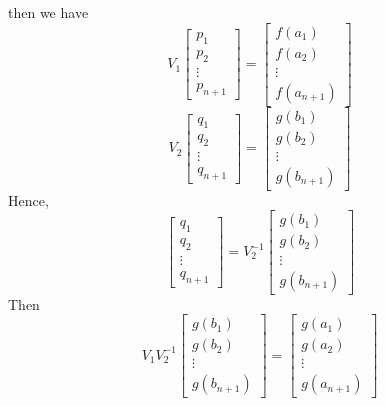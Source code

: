 \documentclass[11pt]{article}
\begin{document}
\begin{enumerate}
			 then we have
			 \[V_1\begin{bmatrix}
			 	p_1\\
			 	p_2\\
			 	\vdots\\
			 	p_{n + 1}
			 \end{bmatrix} = \begin{bmatrix}
			 	f(a_1)\\
			 	f(a_2)\\
			 	\vdots\\
			 	f(a_{n + 1})
			 \end{bmatrix} \]
			 \[V_2\begin{bmatrix}
			 	q_1\\
			 	q_2\\
			 	\vdots\\
			 	q_{n + 1}
			 \end{bmatrix} = \begin{bmatrix}
			 	g(b_1)\\
			 	g(b_2)\\
			 	\vdots\\
			 	g(b_{n + 1})
			 \end{bmatrix} \]
			Hence, 
			\[\begin{bmatrix}
			 	q_1\\
			 	q_2\\
			 	\vdots\\
			 	q_{n + 1}
			 \end{bmatrix} = V_2^{-1}\begin{bmatrix}
			 	g(b_1)\\
			 	g(b_2)\\
			 	\vdots\\
			 	g(b_{n + 1})
			 \end{bmatrix}\]
			 Then
			 \[
			 	V_1V_2^{-1}\begin{bmatrix}
			 	g(b_1)\\
			 	g(b_2)\\
			 	\vdots\\
			 	g(b_{n + 1})
			 \end{bmatrix} = \begin{bmatrix}
			 	g(a_1)\\
			 	g(a_2)\\
			 	\vdots\\
			 	g(a_{n + 1})
			 \end{bmatrix}
			 \]
			 

\end{enumerate}
\end{document}
